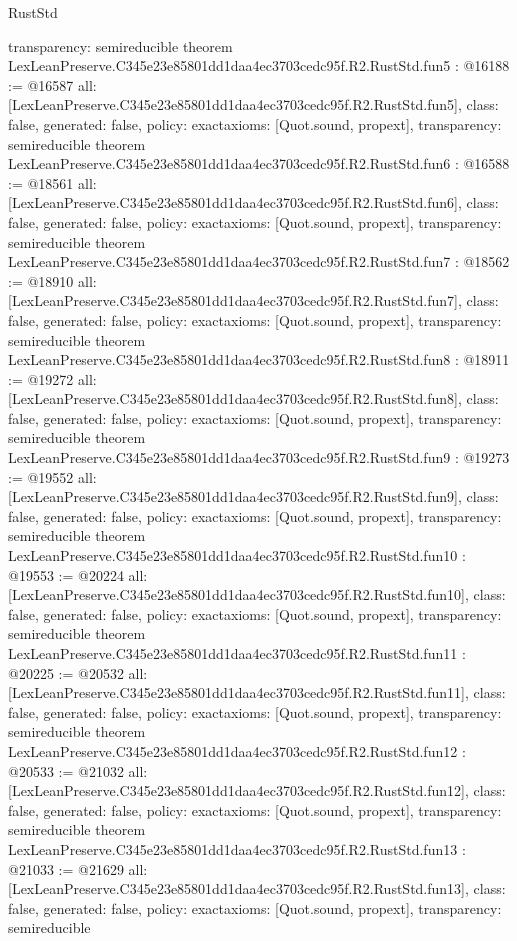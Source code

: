\begin{lexlean}{RustStd}
\begin{coremodule}
{  transparency: semireducible
}
theorem LexLeanPreserve.C345e23e85801dd1daa4ec3703cedc95f.R2.RustStd.fun5 : @16188 := @16587 {
  all: [LexLeanPreserve.C345e23e85801dd1daa4ec3703cedc95f.R2.RustStd.fun5],
  class: false,
  generated: false,
  policy: exact{axioms: [Quot.sound, propext]},
  transparency: semireducible
}
theorem LexLeanPreserve.C345e23e85801dd1daa4ec3703cedc95f.R2.RustStd.fun6 : @16588 := @18561 {
  all: [LexLeanPreserve.C345e23e85801dd1daa4ec3703cedc95f.R2.RustStd.fun6],
  class: false,
  generated: false,
  policy: exact{axioms: [Quot.sound, propext]},
  transparency: semireducible
}
theorem LexLeanPreserve.C345e23e85801dd1daa4ec3703cedc95f.R2.RustStd.fun7 : @18562 := @18910 {
  all: [LexLeanPreserve.C345e23e85801dd1daa4ec3703cedc95f.R2.RustStd.fun7],
  class: false,
  generated: false,
  policy: exact{axioms: [Quot.sound, propext]},
  transparency: semireducible
}
theorem LexLeanPreserve.C345e23e85801dd1daa4ec3703cedc95f.R2.RustStd.fun8 : @18911 := @19272 {
  all: [LexLeanPreserve.C345e23e85801dd1daa4ec3703cedc95f.R2.RustStd.fun8],
  class: false,
  generated: false,
  policy: exact{axioms: [Quot.sound, propext]},
  transparency: semireducible
}
theorem LexLeanPreserve.C345e23e85801dd1daa4ec3703cedc95f.R2.RustStd.fun9 : @19273 := @19552 {
  all: [LexLeanPreserve.C345e23e85801dd1daa4ec3703cedc95f.R2.RustStd.fun9],
  class: false,
  generated: false,
  policy: exact{axioms: [Quot.sound, propext]},
  transparency: semireducible
}
theorem LexLeanPreserve.C345e23e85801dd1daa4ec3703cedc95f.R2.RustStd.fun10 : @19553 := @20224 {
  all: [LexLeanPreserve.C345e23e85801dd1daa4ec3703cedc95f.R2.RustStd.fun10],
  class: false,
  generated: false,
  policy: exact{axioms: [Quot.sound, propext]},
  transparency: semireducible
}
theorem LexLeanPreserve.C345e23e85801dd1daa4ec3703cedc95f.R2.RustStd.fun11 : @20225 := @20532 {
  all: [LexLeanPreserve.C345e23e85801dd1daa4ec3703cedc95f.R2.RustStd.fun11],
  class: false,
  generated: false,
  policy: exact{axioms: [Quot.sound, propext]},
  transparency: semireducible
}
theorem LexLeanPreserve.C345e23e85801dd1daa4ec3703cedc95f.R2.RustStd.fun12 : @20533 := @21032 {
  all: [LexLeanPreserve.C345e23e85801dd1daa4ec3703cedc95f.R2.RustStd.fun12],
  class: false,
  generated: false,
  policy: exact{axioms: [Quot.sound, propext]},
  transparency: semireducible
}
theorem LexLeanPreserve.C345e23e85801dd1daa4ec3703cedc95f.R2.RustStd.fun13 : @21033 := @21629 {
  all: [LexLeanPreserve.C345e23e85801dd1daa4ec3703cedc95f.R2.RustStd.fun13],
  class: false,
  generated: false,
  policy: exact{axioms: [Quot.sound, propext]},
  transparency: semireducible
}
\end{coremodule}
\end{lexlean}
